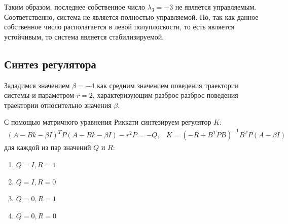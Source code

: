 Таким образом, последнее собственное число $\lambda_3 = -3$ не является управляемым. Соответственно, система не является полностью управляемой. 
Но, так как данное собственное число располагается в левой полуплоскости, то есть является устойчивым, то система является стабилизируемой. 

\subsection{Синтез регулятора}
Зададимся значением $\beta = -4$ как средним значением поведения траектории системы 
и параметром $r = 2$, характеризующим разброс разброс поведения траектории 
относительно значения $\beta$.

С помощью матричного уравнения Риккати синтезируем регулятор $K$: 
\begin{eqnarray}
    (A - Bk - \beta I)^TP(A - Bk - \beta I) - r^2P = -Q, & K = (-R + B^T PB)^{-1}B^TP(A - \beta I)
\end{eqnarray}
для каждой из пар значений $Q$ и $R$:
\begin{enumerate}
    \item $Q = I, R = 1$
    \item $Q = I, R = 0$ 
    \item $Q = 0, R = 1$
    \item $Q = 0, R = 0$
\end{enumerate}


